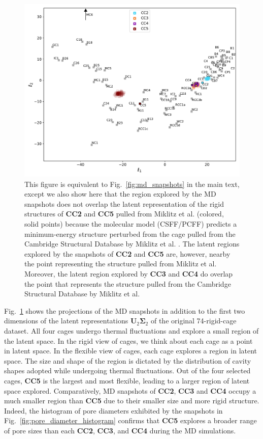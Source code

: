 \documentclass[journal=jacsat,manuscript=article]{achemso}
\begin{document}
\begin{figure}
\centering
	\includegraphics[width=0.8\columnwidth]{../PCA_latent_cage_space_with_flexible_cages_2D_SI.pdf}
	\caption{This figure is equivalent to Fig.~\ref{fig:md_snapshots} in the main text, except we also show here that the region explored by the MD snapshots does not overlap the latent representation of the rigid structures of \textbf{CC2} and \textbf{CC5} pulled from Miklitz et al. \cite{miklitz2017computational} (colored, solid points) because the molecular model (CSFF/PCFF) predicts a minimum-energy structure perturbed from the cage pulled from the Cambridge Structural Database by Miklitz et al. \cite{miklitz2017computational}. The latent regions explored by the snapshots of \textbf{CC2} and \textbf{CC5} are, however, nearby the point representing the structure pulled from Miklitz et al. Moreover, the latent region explored by \textbf{CC3} and \textbf{CC4} do overlap the point that represents the structure pulled from the Cambridge Structural Database by Miklitz et al. \cite{miklitz2017computational}
	} \label{fig:md_snapshots_SI}
\end{figure}

Fig.~\ref{fig:md_snapshots_SI} shows the projections of the MD snapshots in addition to the first two dimensions of the latent representations $\mathbf{U}_2\mathbf{\Sigma}_2$ of the original 74-rigid-cage dataset. All four cages undergo thermal fluctuations and explore a small region of the latent space. 
In the rigid view of cages, we think about each cage as a point in latent space. In the flexible view of cages, each cage explores a region in latent space. The size and shape of the region is dictated by the distribution of cavity shapes adopted while undergoing thermal fluctuations. Out of the four selected cages, \textbf{CC5} is the largest and most flexible, leading to a larger region of latent space explored. Comparatively, MD snapshots of \textbf{CC2}, \textbf{CC3} and \textbf{CC4} occupy a much smaller region than \textbf{CC5} due to their smaller size and more rigid structure. Indeed, the histogram of pore diameters exhibited by the snapshots in Fig.~\ref{fig:pore_diameter_histogram} confirms that \textbf{CC5} explores a broader range of pore sizes than each \textbf{CC2}, \textbf{CC3}, and \textbf{CC4} during the MD simulations.
\end{document}
